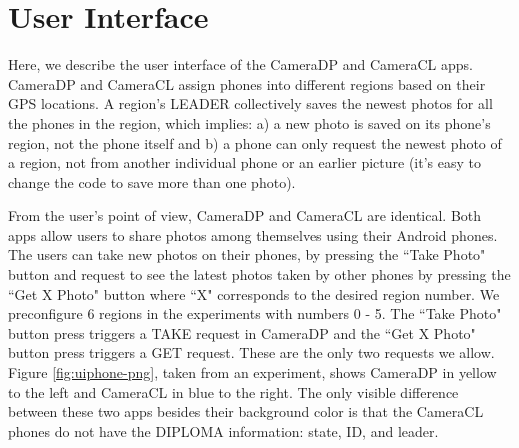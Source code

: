 \chapter{User Interface}

Here, we describe the user interface of the CameraDP and CameraCL apps. CameraDP and CameraCL assign phones into different regions based on their GPS locations. A region's LEADER collectively saves the newest photos for all the phones in the region, which implies: a) a new photo is saved on its phone's region, not the phone itself and b) a phone can only request the newest photo of a region, not from another individual phone or an earlier picture (it's easy to change the code to save more than one photo). 

From the user's point of view, CameraDP and CameraCL are identical. Both apps allow users to share photos among themselves using their Android phones.  The users can take new photos on their phones, by pressing the \textquotedblleft Take Photo" button and request to see the latest photos taken by other phones by pressing the \textquotedblleft Get X Photo" button where \textquotedblleft X" corresponds to the desired region number. We preconfigure 6 regions in the experiments with numbers 0 - 5. The \textquotedblleft Take Photo" button press triggers a TAKE request in CameraDP and the \textquotedblleft Get X Photo" button press triggers a GET request. These are the only two requests we allow.  Figure \ref{fig:uiphone-png}, taken from an experiment, shows CameraDP in yellow to the left and CameraCL in blue to the right. The only visible difference between these two apps besides their background color is that the CameraCL phones do not have the DIPLOMA information: state, ID, and leader.

